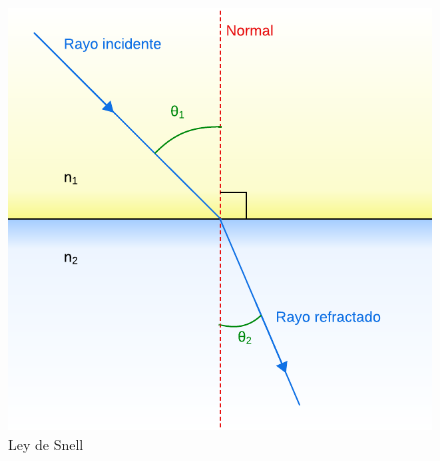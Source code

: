 \begin{figure}[H]
  \centering
  \includegraphics{imagenes/ley_snell.png}
  \caption{Ley de Snell}
\end{figure}
